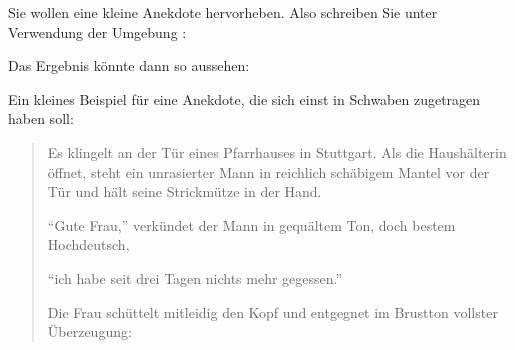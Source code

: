     \begin{Example}
      Sie wollen eine kleine Anekdote hervorheben. Also schreiben Sie
      unter Verwendung der Umgebung :%
        Das Ergebnis könnte dann so aussehen:
        \begin{ShowOutput}
          \iftrue%
            Ein kleines Beispiel für eine Anekdote, die sich einst
            in Schwaben zugetragen haben soll:
          \fi
          \begin{quotation}
            Es klingelt an der Tür eines Pfarrhauses in
            Stuttgart. Als die Haushälterin öffnet, steht ein
            unrasierter Mann in reichlich schäbigem
            Mantel vor der Tür und hält seine Strickmütze in
            der Hand.

            "`Gute Frau,"' verkündet der Mann in gequältem Ton,
            doch bestem Hochdeutsch,

            "`ich habe
            seit drei Tagen nichts mehr gegessen."'

            Die Frau schüttelt mitleidig den Kopf und entgegnet
            im Brustton vollster Überzeugung:


\end{quotation}
\end{ShowOutput}
\end{Example}
